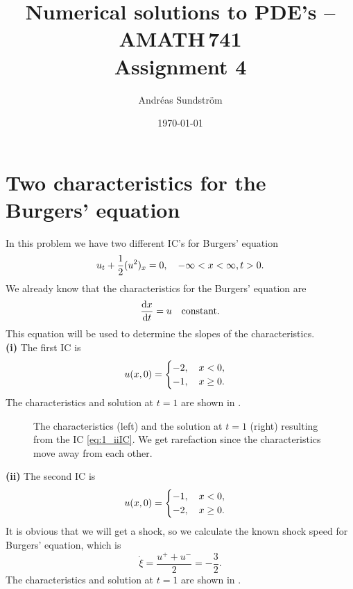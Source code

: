 \documentclass[11pt,letter, swedish, english
]{article}
\renewcommand{\thesubsection}{\arabic{section} (\alph{subsection})}
\begin{document}

\title{Numerical solutions to PDE's -- AMATH\,741 \\
Assignment 4}
\author{Andréas Sundström}
\date{\today}

\maketitle


\section{Two characteristics for the Burgers' equation}
In this problem we have two different IC's for Burgers' equation
\begin{equation}
u_t + \frac{1}{2} (u^2)_x = 0\qcomma
-\infty<x<\infty, t>0.
\end{equation}
We already know that the characteristics for the Burgers' equation are
\begin{equation}
\dv{x}{t} = u \quad\text{constant.}
\end{equation}
This equation will be used to determine the slopes of the
characteristics. 
\\[11pt]
\noindent
\textbf{(i) }
The first IC is
\begin{equation}\label{eq:1_iIC}
u(x, 0) = 
\begin{cases}
-2\qcomma x<0,\\
-1\qcomma x\ge0.
\end{cases}
\end{equation}
The characteristics and solution at $t=1$ are shown in .

\begin{figure}
\centering
\resizebox{!}{3.6cm}{}
\caption{The characteristics (left) and the solution at $t=1$ (right) 
  resulting from the IC \eqref{eq:1_iiIC}. We get rarefaction since
  the characteristics move away from each other.} 
\label{fig:1i}
\end{figure}

\noindent
\textbf{(ii) }
The second IC is
\begin{equation}\label{eq:1_iiIC}
u(x, 0) = 
\begin{cases}
-1\qcomma x<0,\\
-2\qcomma x\ge0.
\end{cases}
\end{equation}
It is obvious that we will get a shock, so we calculate the known shock
speed for Burgers' equation, which is
\begin{equation}
\dot\xi = \frac{u^++u^-}{2} = -\frac{3}{2}.
\end{equation}
The characteristics and solution at $t=1$ are shown in .
\end{document}
